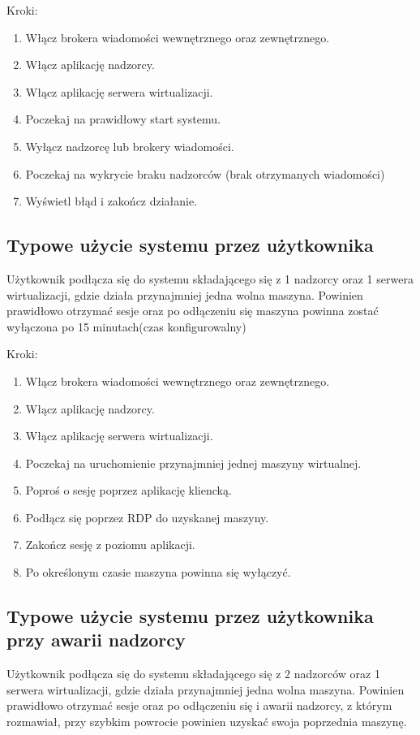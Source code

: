 \documentclass[12pt]{article}
\begin{document}
Kroki:
\begin{enumerate}
	\item Włącz brokera wiadomości wewnętrznego oraz zewnętrznego.
	\item Włącz aplikację nadzorcy.
	\item Włącz aplikację serwera wirtualizacji.
	\item Poczekaj na prawidłowy start systemu.
	\item Wyłącz nadzorcę lub brokery wiadomości.
	\item Poczekaj na wykrycie braku nadzorców (brak otrzymanych wiadomości)
	\item Wyświetl błąd i zakończ działanie.
\end{enumerate}

\subsection{Typowe użycie systemu przez użytkownika}
Użytkownik podłącza się do systemu składającego się z 1 nadzorcy oraz 1 serwera wirtualizacji, gdzie działa przynajmniej jedna wolna maszyna.
Powinien prawidłowo otrzymać sesje oraz po odłączeniu się maszyna powinna zostać wyłączona po 15 minutach(czas konfigurowalny)

Kroki:
\begin{enumerate}
	\item Włącz brokera wiadomości wewnętrznego oraz zewnętrznego.
	\item Włącz aplikację nadzorcy.
	\item Włącz aplikację serwera wirtualizacji.
	\item Poczekaj na uruchomienie przynajmniej jednej maszyny wirtualnej.
	\item Poproś o sesję poprzez aplikację kliencką.
	\item Podłącz się poprzez RDP do uzyskanej maszyny.
	\item Zakończ sesję z poziomu aplikacji.
	\item Po określonym czasie maszyna powinna się wyłączyć.
\end{enumerate}

\subsection{Typowe użycie systemu przez użytkownika przy awarii nadzorcy}
Użytkownik podłącza się do systemu składającego się z 2 nadzorców oraz 1 serwera wirtualizacji, gdzie działa przynajmniej jedna wolna maszyna.
Powinien prawidłowo otrzymać sesje oraz po odłączeniu się i awarii nadzorcy, z którym rozmawiał, przy szybkim powrocie powinien uzyskać swoja poprzednia maszynę.
\end{document}
